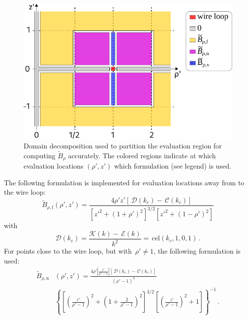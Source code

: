 \begin{figure}[htbp]
    \centering
    \includegraphics{img/cwl_B_rho_regions.pdf}
    \caption{Domain decomposition used to partition the evaluation region
             for computing $\tilde{B}_\rho$ accurately.
             The colored regions indicate at which evaluation locations $(\rho',z')$
             which formulation (see legend) is used.}
    \label{fig:cwl_B_rho_regions}
\end{figure}
The following formulation is implemented for evaluation locations away from to the wire loop:
\begin{equation}
  \tilde{B}_{\rho,\mathrm{f}} (\rho', z')
  = \frac{4 \rho' z' \left[ \,\mathcal{D}(k_c) - \,\mathcal{C}(k_c) \right]}
         {\left[{z'}^2 + (1 + \rho')^2 \right]^{3/2} \left[{z'}^2 + (1 - \rho')^2 \right] } \label{eqn:cwl_B_rho_f}
\end{equation}
with
\begin{equation}
  \mathcal{D}(k_c)
  = \frac{\mathcal{K}(k) - \,\mathcal{E}(k)}{k^2}
  = \,\mathrm{cel}(k_c, 1, 0, 1) \, . \label{eqn:elliptic_d}
\end{equation}
For points close to the wire loop, but with~$\rho' \neq 1$, the following formulation is used:
\begin{align}
  \tilde{B}_{\rho,\mathrm{n}}& (\rho', z')
  = \frac{4 \rho' \left|\frac{z'}{\rho'-1}\right| \left[ \,\mathcal{D}(k_c) - \,\mathcal{C}(k_c) \right]}
         {(\rho' - 1)^4} \nonumber \\
  ~& \left\{
      \left[ \left( \frac{z'}{\rho'-1} \right)^2 + \left(1 + \frac{2}{\rho'-1} \right)^2 \right]^{3/2}
      \left[ \left( \frac{z'}{\rho'-1} \right)^2 + 1 \right]
    \right\}^{-1} \label{eqn:cwl_B_rho_n} \, .
\end{align}
